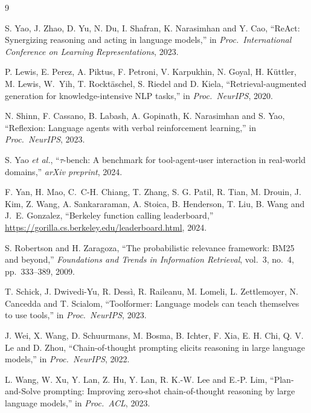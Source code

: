 \documentclass[conference]{IEEEtran}
\begin{document}
\begin{thebibliography}{9}

S. Yao, J. Zhao, D. Yu, N. Du, I. Shafran, K. Narasimhan and
Y. Cao, ``ReAct: Synergizing reasoning and acting in language
models,'' in \emph{Proc.\ International Conference on Learning
Representations}, 2023.

P. Lewis, E. Perez, A. Piktus, F. Petroni, V. Karpukhin, N. Goyal,
H. K\"uttler, M. Lewis, W.~Yih, T. Rockt\"aschel, S. Riedel and
D. Kiela, ``Retrieval-augmented generation for knowledge-intensive
NLP tasks,'' in \emph{Proc.\ NeurIPS}, 2020.

N. Shinn, F. Cassano, B. Labash, A. Gopinath, K. Narasimhan and
S. Yao, ``Reflexion: Language agents with verbal reinforcement
learning,'' in \emph{Proc.\ NeurIPS}, 2023.

S. Yao \emph{et al.}, ``$\tau$-bench: A benchmark for
tool-agent-user interaction in real-world domains,'' \emph{arXiv
preprint}, 2024.

F. Yan, H. Mao, C.~C-H. Chiang, T. Zhang, S. G. Patil, R. Tian,
M. Drouin, J. Kim, Z. Wang, A. Sankararaman, A. Stoica,
B. Henderson, T. Liu, B. Wang and J.~E. Gonzalez, ``Berkeley
function calling leaderboard,''
\url{https://gorilla.cs.berkeley.edu/leaderboard.html}, 2024.

S. Robertson and H. Zaragoza, ``The probabilistic relevance
framework: BM25 and beyond,'' \emph{Foundations and Trends in
Information Retrieval}, vol.~3, no.~4, pp.~333--389, 2009.

T. Schick, J. Dwivedi-Yu, R. Dess\`i, R. Raileanu, M. Lomeli,
L. Zettlemoyer, N. Cancedda and T. Scialom, ``Toolformer:
Language models can teach themselves to use tools,'' in
\emph{Proc.\ NeurIPS}, 2023.

J. Wei, X. Wang, D. Schuurmans, M. Bosma, B. Ichter, F. Xia,
E. H. Chi, Q. V. Le and D. Zhou, ``Chain-of-thought prompting
elicits reasoning in large language models,'' in \emph{Proc.\
NeurIPS}, 2022.

L. Wang, W. Xu, Y. Lan, Z. Hu, Y. Lan, R. K.-W. Lee and E.-P. Lim,
``Plan-and-Solve prompting: Improving zero-shot chain-of-thought
reasoning by large language models,'' in \emph{Proc.\ ACL},
2023.

\end{thebibliography}
\end{document}
